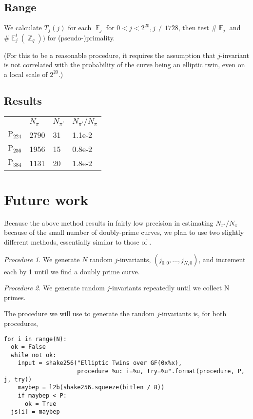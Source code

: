 \documentclass[11pt,fleqn]{article}
\newcommand{\Ejt}{\ensuremath{\BbbE^t_j(\BbbZ_q))} }
\newcommand{\Tf}{\ensuremath{T_f(j)} }
\newcommand{\Pa}{\ensuremath{\mathup{P}_{224}} }
\newcommand{\Pb}{\ensuremath{\mathup{P}_{256}} }
\newcommand{\Pc}{\ensuremath{\mathup{P}_{384}} }
\newcommand{\Ej}{\ensuremath{\BbbE_j} }
\begin{document}
\subsection{Range} 

We calculate \Tf for each \Ej for $0 < j < 2^{20}, j \neq 1728$, then
test $\#\Ej$ and $\#\Ejt$ for (pseudo-)primality.

(For this to be a reasonable procedure, it requires the assumption that
$j$-invariant is not correlated with the probability of the curve being
an elliptic twin, even on a local scale of $2^20$.)

\subsection{Results} 

\begin{tabular}[l]{l|lll}
      & $N_{\pi}$ & $N_{\pi'}$ & $N_{\pi'} / N_{\pi}$ \\
  \Pa & 2790 & 31 & 1.1e-2 \\
  \Pb & 1956 & 15 & 0.8e-2 \\
  \Pc & 1131 & 20 & 1.8e-2 \\
\end{tabular}

\section{Future work}

Because the above method results in fairly low precision in estimating
$N_{\pi'} / N_{\pi}$ because of the small number of doubly-prime curves,
we plan to use two slightly different methods, essentially similar to those
of \autocite{ShparlinskiSutantyo}.

\emph{Procedure 1.} We generate $N$ random $j$-invariants, $(j_{0,0}, \ldots, j_{N,0})$,
and increment each by 1 until we find a doubly prime curve.

\emph{Procedure 2.} We generate random $j$-invariants repeatedly until we collect
N primes.

The procedure we will use to generate the random $j$-invariants is, for both procedures,

{\tiny
\begin{verbatim}
for i in range(N):
  ok = False
  while not ok:
    input = shake256("Elliptic Twins over GF(0x%x),
                     procedure %u: i=%u, try=%u".format(procedure, P, j, try))
    maybep = l2b(shake256.squeeze(bitlen / 8))
    if maybep < P:
      ok = True
  js[i] = maybep
\end{verbatim}
}
\end{document}
